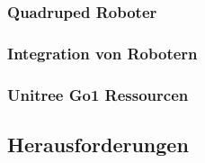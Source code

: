\subsubsection{Quadruped Roboter}

\subsubsection{Integration von Robotern}

\subsubsection{Unitree Go1 Ressourcen}


\subsection{Herausforderungen}
\label{subsec:herausforderungen}


%
%
%


